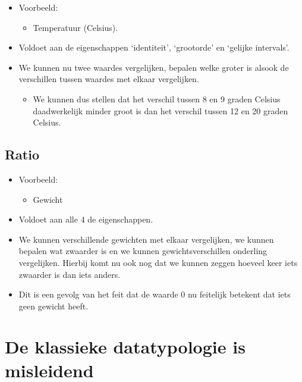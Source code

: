 \documentclass[]{memoir}
\providecommand{\tightlist}{%
  \setlength{\itemsep}{0pt}\setlength{\parskip}{0pt}}
\begin{document}
\begin{itemize}
\tightlist
\item
  Voorbeeld:

  \begin{itemize}
  \tightlist
  \item
    Temperatuur (Celsius).
  \end{itemize}
\item
  Voldoet aan de eigenschappen `identiteit', `grootorde' en `gelijke
  intervals'.
\item
  We kunnen nu twee waardes vergelijken, bepalen welke groter is alsook
  de verschillen tussen waardes met elkaar vergelijken.

  \begin{itemize}
  \tightlist
  \item
    We kunnen dus stellen dat het verschil tussen 8 en 9 graden Celsius
    daadwerkelijk minder groot is dan het verschil tussen 12 en 20
    graden Celsius.
  \end{itemize}
\end{itemize}

\subsection*{Ratio}\label{ratio}

\begin{itemize}
\tightlist
\item
  Voorbeeld:

  \begin{itemize}
  \tightlist
  \item
    Gewicht
  \end{itemize}
\item
  Voldoet aan alle 4 de eigenschappen.
\item
  We kunnen verschillende gewichten met elkaar vergelijken, we kunnen
  bepalen wat zwaarder is en we kunnen gewichtsverschillen onderling
  vergelijken. Hierbij komt nu ook nog dat we kunnen zeggen hoeveel keer
  iets zwaarder is dan iets anders.
\item
  Dit is een gevolg van het feit dat de waarde 0 nu feitelijk betekent
  dat iets geen gewicht heeft.
\end{itemize}

\section{De klassieke datatypologie is
misleidend}\label{de-klassieke-datatypologie-is-misleidend}
\end{document}
